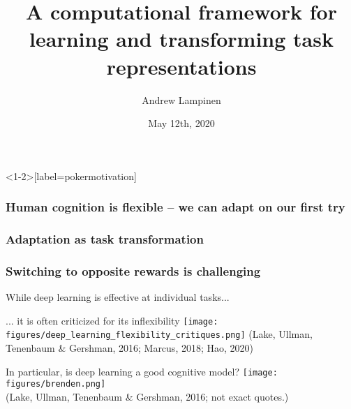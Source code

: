 \documentclass{beamer}
\begin{document}
\title{A computational framework for learning and transforming task representations}
\author{Andrew Lampinen}
\date{May 12th, 2020}
\frame{\titlepage}


\begin{frame}<1-2>[label=pokermotivation]
\frametitle<1-2>{Human cognition is flexible -- we can adapt on our first try}
\frametitle<3-4>{Adaptation as task transformation}
\frametitle<5>{Switching to opposite rewards is challenging}
\centering
{}
\end{frame}

\begin{frame}{While deep learning is effective at individual tasks...}
\centering
{}
\end{frame}

\begin{frame}{... it is often criticized for its inflexibility}
\texttt{[image: figures/deep\_learning\_flexibility\_critiques.png]}
{\scriptsize (Lake, Ullman, Tenenbaum \& Gershman, 2016; Marcus, 2018; Hao, 2020)}
\end{frame}

\begin{frame}{In particular, is deep learning a good cognitive model?}
\phantom{}
{
\centering
\texttt{[image: figures/brenden.png]}\\
}
{\scriptsize (Lake, Ullman, Tenenbaum \& Gershman, 2016; not exact quotes.)}
\end{frame}
\end{document}
